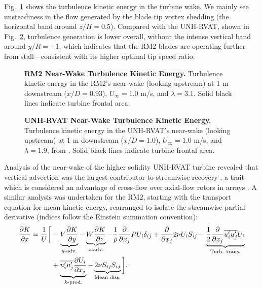 \documentclass[10pt,letterpaper]{article}
\def \p{\partial}
\begin{document}
Fig.~\ref{fig:kcont} shows the turbulence kinetic energy in the turbine wake. We
mainly see unsteadiness in the flow generated by the blade tip vortex shedding
(the horizontal band around $z/H=0.5$). Compared with the UNH-RVAT, shown in
Fig.~\ref{fig:rvat-kcont}, turbulence generation is lower overall, without the
intense vertical band around $y/R=-1$, which indicates that the RM2 blades are
operating further from stall---consistent with its higher optimal tip speed
ratio.

\begin{figure}

    \caption{{\bf RM2 Near-Wake Turbulence Kinetic Energy.} Turbulence kinetic
        energy in the RM2's near-wake (looking upstream) at 1 m downstream
        ($x/D=0.93$), $U_\infty=1.0$ m/s, and $\lambda=3.1$. Solid black lines
        indicate turbine frontal area.}

    \label{fig:kcont}
\end{figure}

\begin{figure}

    \caption{{\bf UNH-RVAT Near-Wake Turbulence Kinetic Energy.} Turbulence
        kinetic energy in the UNH-RVAT's near-wake (looking upstream) at 1 m
        downstream ($x/D=1.0$), $U_\infty=1.0$ m/s, and $\lambda=1.9$, from
        \cite{Bachant2016-Energies}. Solid black lines indicate turbine frontal
        area.}

    \label{fig:rvat-kcont}
\end{figure}

Analysis of the near-wake of the higher solidity UNH-RVAT turbine revealed that
vertical advection was the largest contributor to streamwise recovery
\cite{Bachant2015-JoT}, a trait which is considered an advantage of cross-flow
over axial-flow rotors in arrays \cite{Kinzel2012}. A similar analysis was
undertaken for the RM2, starting with the transport equation for mean kinetic
energy, rearranged to isolate the streamwise partial derivative (indices follow
the Einstein summation convention):
\begin{equation}
    \begin{split}
        \frac{\p K}{\p x}
        =
        \frac{1}{U}
        \bigg{[}
        & - \underbrace{V \frac{\p K}{\p y}}_{y\text{-adv.}}
        - \underbrace{W \frac{\p K}{\p z}}_{z\text{-adv.}}
        - \frac{1}{\rho}\frac{\p}{\p x_j} P U_i \delta_{ij}
        + \frac{\p}{\p x_j} 2 \nu U_i S_{ij}
        - \underbrace{
            \frac{1}{2}\frac{\p}{\p x_j} \overline{u_i' u_j'} U_i
        }_{\text{Turb. trans.}} \\
        & +
        \underbrace{
            \overline{u_i' u_j'} \frac{\p U_i}{\p x_j}
        }_{k\text{-prod.}}
        -
        \underbrace{
            2 \nu S_{ij}S_{ij}
        }_{\text{Mean diss.}}
        \bigg{]}.
    \end{split}
    \label{eq:K-full}
\end{equation}
\end{document}
